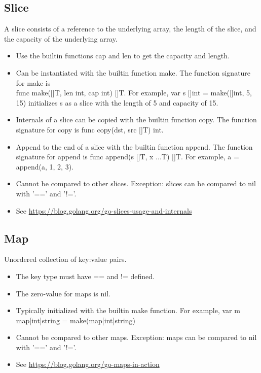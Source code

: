 \documentclass{article}
\begin{document}
	\subsection{Slice}
		A slice consists of a reference to the underlying array, the length of the slice, and the capacity of the underlying array. 				
		\begin{itemize}
			\item Use the builtin functions \colorbox{code}{cap} and \colorbox{code}{len} to get the capacity and length.
			\item Can be instantiated with the builtin function \colorbox{code}{make}. The function signature for \colorbox{code}{make} is \\ \colorbox{code}{func make([]T, len int, cap int) []T}. For example, \colorbox{code}{var s []int = make([]int, 5, 15)} initializes \colorbox{code}{s} as a slice with the length of 5 and capacity of 15. 
			\item Internals of a slice can be copied with the builtin function \colorbox{code}{copy}. The function signature for \colorbox{code}{copy} is \colorbox{code}{func copy(dst, src []T) int}.
			\item Append to the end of a slice with the builtin function \colorbox{code}{append}. The function signature for \colorbox{code}{append} is \colorbox{code}{func append(s []T, x ...T) []T}. For example, \colorbox{code}{a = append(a, 1, 2, 3)}.
			\item Cannot be compared to other slices. Exception: slices can be compared to \colorbox{code}{nil} with '==' and '!='.
			\item See \url{https://blog.golang.org/go-slices-usage-and-internals}
		\end{itemize}
				
	\subsection{Map}
		Unordered collection of key:value pairs. 
		\begin{itemize}
			\item The key type must have \colorbox{code}{==} and \colorbox{code}{!=} defined. 
			\item The zero-value for maps is \colorbox{code}{nil}.
			\item Typically initialized with the builtin \colorbox{code}{make} function. For example, \colorbox{code}{var m map[int]string = make(map[int]string)}
			\item Cannot be compared to other maps. Exception: maps can be compared to \colorbox{code}{nil} with '==' and '!='.
			\item See \url{https://blog.golang.org/go-maps-in-action}
		\end{itemize}
		
\end{document}

